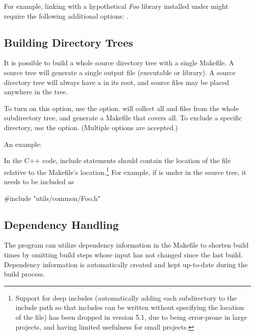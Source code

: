 For example, linking with a hypothetical \textit{Foo} library installed under
 might require the following additional  options:
.


\subsection{Building Directory Trees}
\label{sec:build-sim-progs:building-directory-trees}

It is possible to build a whole source directory tree with a single Makefile.
A source tree will generate a single output file (executable or library).
A source directory tree will always have a  in its root,
and source files may be placed anywhere in the tree.

To turn on this option, use the  option.
 will collect all  and  files from
the whole subdirectory tree, and generate a Makefile that covers all.
To exclude a specific directory, use the 
option. (Multiple  options are accepted.)

An example:


In the C++ code, include statements should contain the location of the file
relative to the Makefile's location.\footnote{
  Support for deep includes (automatically adding each subdirectory
  to the include path so that includes can be written without specifying
  the location of the file) has been dropped in {\opp} version 5.1, due to
  being error-prone in large projects, and having limited usefulness for
  small projects.}
For example, if  is under  in the source
tree, it needs to be included as

\begin{cpp}
#include "utils/common/Foo.h"
\end{cpp}


\subsection{Dependency Handling}
\label{sec:build-sim-progs:dependency-handling}

The  program can utilize dependency information in the Makefile
to shorten build times by omitting build steps whose input has not changed
since the last build. Dependency information is automatically created and kept
up-to-date during the build process.

